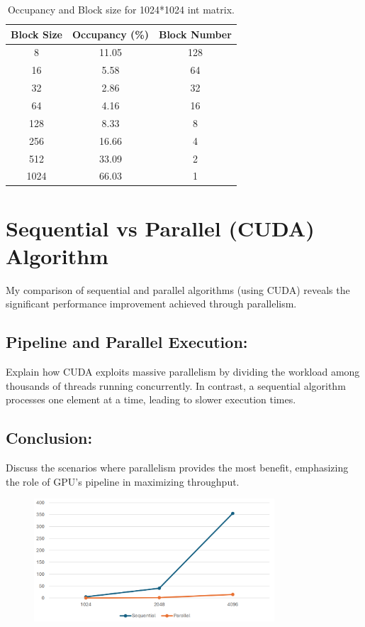 \documentclass{article}
\begin{document}
\begin{table}[h!]
    \centering
    \begin{tabular}{@{}ccc@{}}
        \toprule
        Block Size & Occupancy (\%) & Block Number \\
        \midrule
        8 & 11.05 & 128 \\
        16 & 5.58 & 64 \\
        32 & 2.86 & 32 \\
        64 & 4.16 & 16 \\
        128 & 8.33 & 8 \\
        256 & 16.66 & 4 \\
        512 & 33.09 & 2 \\
        1024 & 66.03 & 1 \\
        \bottomrule
    \end{tabular}
    \caption{Occupancy and Block size for 1024*1024 int matrix.}
    \label{tab:block_size}
\end{table}


\section{Sequential vs Parallel (CUDA) Algorithm}

My comparison of sequential and parallel algorithms (using CUDA) reveals the significant performance improvement achieved through parallelism.

\subsection{Pipeline and Parallel Execution:}

Explain how CUDA exploits massive parallelism by dividing the workload among thousands of threads running concurrently. In contrast, a sequential algorithm processes one element at a time, leading to slower execution times.

\subsection{Conclusion:}

Discuss the scenarios where parallelism provides the most benefit, emphasizing the role of GPU’s pipeline in maximizing throughput.
\begin{figure}[h!]
    \centering
    \includegraphics[width=0.8\textwidth]{2.png}
\end{figure}
\end{document}
